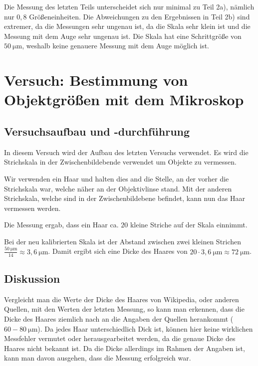         Die Messung des letzten Teils unterscheidet sich nur minimal zu Teil 2a), nämlich nur $0,8$ Größeneinheiten. Die Abweichungen zu den Ergebnissen in Teil 2b) sind extremer, da die Messungen sehr ungenau ist, da die Skala sehr klein ist und die Messung mit dem Auge sehr ungenau ist. Die Skala hat eine Schrittgröße von $50\ \mathrm{\mu m}$, weshalb keine genauere Messung mit dem Auge möglich ist.

\newpage

\section{Versuch: Bestimmung von Objektgrößen mit dem Mikroskop}

    \subsection{Versuchsaufbau und -durchführung}
        
        In diesem Versuch wird der Aufbau des letzten Versuchs verwendet. Es wird die Strichskala in der Zwischenbildebende verwendet um Objekte zu vermessen.

        Wir verwenden ein Haar und halten dies and die Stelle, an der vorher die Strichskala war, welche näher an der Objektivlinse stand. Mit der anderen Strichskala, welche sind in der Zwischenbildebene befindet, kann nun das Haar vermessen werden.

        Die Messung ergab, dass ein Haar ca. $20$ kleine Striche auf der Skala einnimmt.

        Bei der neu kalibrierten Skala ist der Abstand zwischen zwei kleinen Strichen $\frac{50\ \mathrm{\mu m}}{14} \approx 3,6\ \mathrm{\mu m}$. Damit ergibt sich eine Dicke des Haares von $20 \cdot 3,6\ \mathrm{\mu m} \approx 72\ \mathrm{\mu m}$.
    
    \subsection{Diskussion}
        
        Vergleicht man die Werte der Dicke des Haares von Wikipedia, oder anderen Quellen, mit den Werten der letzten Messung, so kann man erkennen, dass die Dicke des Haares ziemlich nach an die Angaben der Quellen herankommt ($60-80\ \mathrm{\mu m}$). Da jedes Haar unterschiedlich Dick ist, können hier keine wirklichen Messfehler vermutet oder herausgearbeitet werden, da die genaue Dicke des Haares nicht bekannt ist. Da die Dicke allerdings im Rahmen der Angaben ist, kann man davon ausgehen, dass die Messung erfolgreich war.